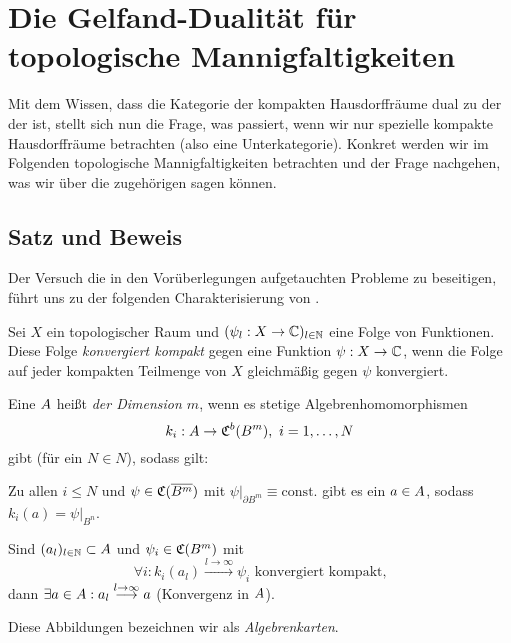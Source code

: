 \section{Die Gelfand-Dualität für topologische Mannigfaltigkeiten}\label{sec:GD2}

Mit dem Wissen, dass die Kategorie der kompakten Hausdorffräume dual zu der der \CAlgn{} ist, stellt sich nun die Frage, was passiert, wenn wir nur spezielle kompakte Hausdorffräume betrachten (also eine Unterkategorie). Konkret werden wir im Folgenden topologische Mannigfaltigkeiten betrachten und der Frage nachgehen, was wir über die zugehörigen \CAlgn{} sagen können.



\subsection{Satz und Beweis}

Der Versuch die in den Vorüberlegungen aufgetauchten Probleme zu beseitigen, führt uns zu der folgenden Charakterisierung von \CAlgMann.

\begin{defn}\label{defn:komKonv}
Sei $X$ ein topologischer Raum und $(\psi_l: X \to \mathbb{C})_{l \in \mathbb{N}}$ eine Folge von Funktionen. Diese Folge \emph{konvergiert kompakt} gegen eine Funktion $\psi: X \to \mathbb{C}$, wenn die Folge auf jeder kompakten Teilmenge von $X$ gleichmäßig gegen $\psi$ konvergiert.
\end{defn}

\begin{defn}[\CAlgMann]\label{defn:CAM}
Eine \CAlg{} $A$ heißt \emph{\CAlgMan{} der Dimension $m$}, wenn es stetige Algebrenhomomorphismen
	\[k_i: A \to \mathfrak{C}^b(B^m), ~i = 1, \dots , N\]
gibt (für ein $N \in N$), sodass gilt:
\begin{defenum}
	\item \label{defn:CAM:surj}
	Zu allen $i \leq N$ und $\psi \in \mathfrak{C}(\overline{B^m})$ mit $\psi|_{\partial B^m} \equiv \mathrm{const.}$ gibt es ein $a \in A$, sodass $k_i(a) = \psi|_{B^n}$.
	\item \label{defn:CAM:kompkonv}
	Sind $(a_l)_{l \in \mathbb{N}} \subset A$ und $\psi_i \in \mathfrak{C}(B^m)$ mit
	\[\forall i: k_i(a_l) \overset{l \to \infty}{\longrightarrow} \psi_i \text{ konvergiert kompakt,}\]
	dann $\exists a \in A: a_l \overset{l \to \infty}{\longrightarrow} a$ (Konvergenz in $A$).
\end{defenum}
Diese Abbildungen bezeichnen wir als \emph{Algebrenkarten}.
\end{defn}

